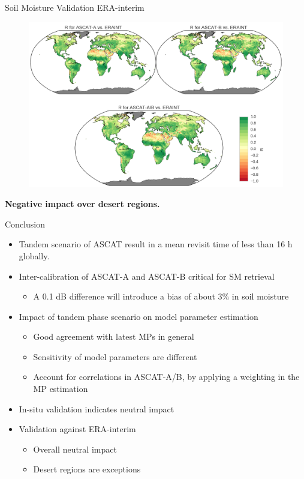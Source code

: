 \documentclass[10pt,ignorenonframetext,xcolor={dvipsnames, table}]{beamer}
\providecommand{\tightlist}{%
\setlength{\itemsep}{0pt}\setlength{\parskip}{0pt}}
\begin{document}
\begin{frame}{Soil Moisture Validation ERA-interim}

\begin{figure}
\includegraphics[width=.9\textwidth]{./figures/ASCAT_ERAINT_maps_crop.png}
\end{figure}\begin{center}
\textbf{Negative impact over desert regions.}
\end{center}

\end{frame}

\begin{frame}{Conclusion}

\begin{itemize}
\item
  Tandem scenario of ASCAT result in a mean revisit time of less than 16
  h globally.
\item
  Inter-calibration of ASCAT-A and ASCAT-B critical for SM retrieval

  \begin{itemize}
  \tightlist
  \item
    A 0.1 dB difference will introduce a bias of about 3\% in soil
    moisture
  \end{itemize}
\item
  Impact of tandem phase scenario on model parameter estimation

  \begin{itemize}
  \tightlist
  \item
    Good agreement with latest MPs in general
  \item
    Sensitivity of model parameters are different
  \item
    Account for correlations in ASCAT-A/B, by applying a weighting in
    the MP estimation
  \end{itemize}
\item
  In-situ validation indicates neutral impact
\item
  Validation against ERA-interim

  \begin{itemize}
  \tightlist
  \item
    Overall neutral impact
  \item
    Desert regions are exceptions
  \end{itemize}
\end{itemize}

\end{frame}
\end{document}
